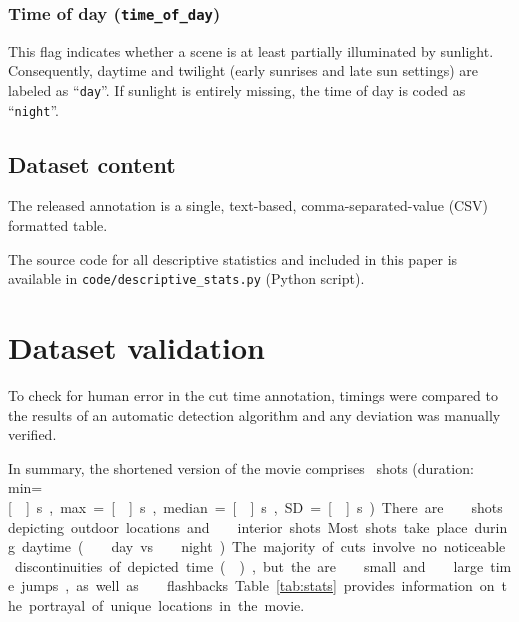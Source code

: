 \documentclass[10pt,a4paper]{article}
\begin{document}
\begin{multicols}{2}
\subsubsection*{Time of day (\texttt{time\_of\_day})}

This flag indicates whether a scene is at least partially illuminated by
sunlight. Consequently, daytime and twilight (early sunrises and late sun
settings) are labeled as ``\texttt{day}''. If sunlight is entirely missing, the
time of day is coded as ``\texttt{night}''.



\subsection*{Dataset content}

The released annotation is a single, text-based, comma-separated-value (CSV)
formatted table.

The source code for all descriptive statistics and included in this paper is
available in \texttt{code/descriptive\_stats.py} (Python script).


\section*{Dataset validation}

To check for human error in the cut time annotation, timings were compared to
the results of an automatic detection algorithm and any deviation was manually
verified.

In summary, the shortened version of the movie comprises \NShots\ shots
(duration: min=\unit[\ShotLengthMin]{s}, max=\unit[\ShotLengthMax]{s},
median=\unit[\ShotLengthMedian]{s}, SD=\unit[\ShotLengthSD]{s}). There are
\NExteriorShots\ shots depicting outdoor locations and \NInteriorShots\
interior shots. Most shots take place during daytime (\NDayShots\ day
vs.~\NNightShots\ night). The majority of cuts involve no
noticeable discontinuities of depicted time (\NShotsTimeNoJump), but the are
\NShotsTimeSmallJump\ small and \NShotsTimeLargeJump\ large time jumps, as
well as \NShotsTimeFlashback\ flashbacks.

Table \ref{tab:stats} provides information on the portrayal of unique locations
in the movie.



\end{multicols}
\end{document}
